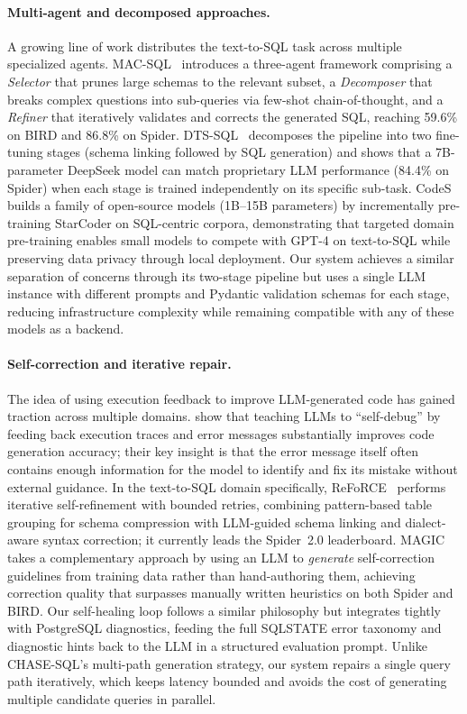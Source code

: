 \documentclass{article}
\begin{document}
\paragraph{Multi-agent and decomposed approaches.}
A growing line of work distributes the text-to-SQL task across multiple specialized agents. MAC-SQL~\citep{macsql2023} introduces a three-agent framework comprising a \emph{Selector} that prunes large schemas to the relevant subset, a \emph{Decomposer} that breaks complex questions into sub-queries via few-shot chain-of-thought, and a \emph{Refiner} that iteratively validates and corrects the generated SQL, reaching 59.6\% on BIRD and 86.8\% on Spider. DTS-SQL~\citep{pourreza2024dtssql} decomposes the pipeline into two fine-tuning stages (schema linking followed by SQL generation) and shows that a 7B-parameter DeepSeek model can match proprietary LLM performance (84.4\% on Spider) when each stage is trained independently on its specific sub-task. CodeS~\citep{li2024codes} builds a family of open-source models (1B--15B parameters) by incrementally pre-training StarCoder on SQL-centric corpora, demonstrating that targeted domain pre-training enables small models to compete with GPT-4 on text-to-SQL while preserving data privacy through local deployment. Our system achieves a similar separation of concerns through its two-stage pipeline but uses a single LLM instance with different prompts and Pydantic validation schemas for each stage, reducing infrastructure complexity while remaining compatible with any of these models as a backend.

\paragraph{Self-correction and iterative repair.}
The idea of using execution feedback to improve LLM-generated code has gained traction across multiple domains. \citet{chen2024teaching} show that teaching LLMs to ``self-debug'' by feeding back execution traces and error messages substantially improves code generation accuracy; their key insight is that the error message itself often contains enough information for the model to identify and fix its mistake without external guidance. In the text-to-SQL domain specifically, ReFoRCE~\citep{deng2025reforce} performs iterative self-refinement with bounded retries, combining pattern-based table grouping for schema compression with LLM-guided schema linking and dialect-aware syntax correction; it currently leads the Spider~2.0 leaderboard. MAGIC~\citep{askari2025magic} takes a complementary approach by using an LLM to \emph{generate} self-correction guidelines from training data rather than hand-authoring them, achieving correction quality that surpasses manually written heuristics on both Spider and BIRD. Our self-healing loop follows a similar philosophy but integrates tightly with PostgreSQL diagnostics, feeding the full SQLSTATE error taxonomy and diagnostic hints back to the LLM in a structured evaluation prompt. Unlike CHASE-SQL's multi-path generation strategy, our system repairs a single query path iteratively, which keeps latency bounded and avoids the cost of generating multiple candidate queries in parallel.
\end{document}
